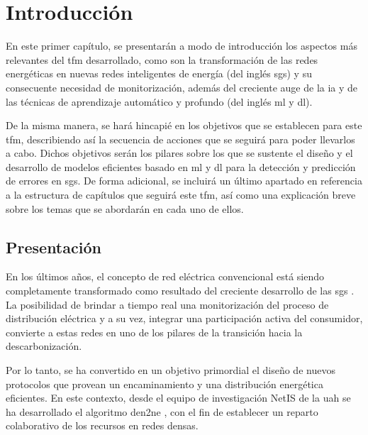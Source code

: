 
\chapter{Introducción}
\label{ch:intro}

En este primer capítulo, se presentarán a modo de introducción los aspectos más relevantes del \acrlong{tfm} desarrollado, como son la transformación de las redes energéticas en nuevas redes inteligentes de energía (del inglés \gls{sgs}) y su consecuente necesidad de monitorización, además del creciente auge de la \gls{ia} y de las técnicas de aprendizaje automático y profundo (del inglés \acrlong{ml} y \acrlong{dl}).

\vspace{3mm}

De la misma manera, se hará hincapié en los objetivos que se establecen para este \gls{tfm}, describiendo así la secuencia de acciones que se seguirá para poder llevarlos a cabo. Dichos objetivos serán los pilares sobre los que se sustente el diseño y el desarrollo de modelos eficientes basado en \gls{ml} y \gls{dl} para la detección y predicción de errores en \gls{sg}s. De forma adicional, se incluirá un último apartado en referencia a la estructura de capítulos que seguirá este \gls{tfm}, así como una explicación breve sobre los temas que se abordarán en cada uno de ellos.


\section{Presentación}
\label{sec:presentacion}

En los últimos años, el concepto de red eléctrica convencional está siendo completamente transformado como resultado del creciente desarrollo de las \gls{sg}s \cite{repsol} \cite{impact}. La posibilidad de brindar a tiempo real una monitorización del proceso de distribución eléctrica y a su vez, integrar una participación activa del consumidor, convierte a estas redes en uno de los pilares de la transición hacia la descarbonización. 

\vspace{3mm}

Por lo tanto, se ha convertido en un objetivo primordial el diseño de nuevos protocolos que provean un encaminamiento y una distribución energética eficientes. En este contexto, desde el equipo de investigación NetIS de la \gls{uah} se ha desarrollado el algoritmo \gls{den2ne} \cite{den2ne}, con el fin de establecer un reparto colaborativo de los recursos en redes densas.  

